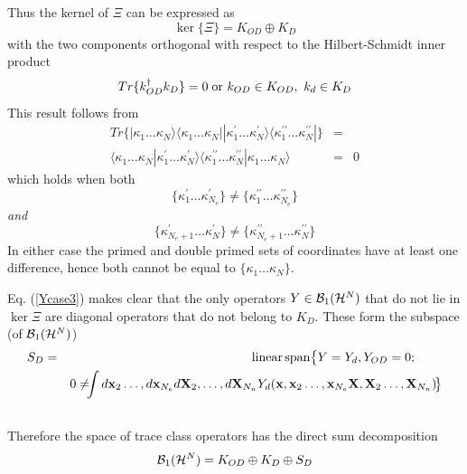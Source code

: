 Thus the kernel of $\Xi $ can be expressed as 
\begin{equation}
\ker \{\Xi \}=K_{OD}\oplus K_{D}
\end{equation}%
with the two components orthogonal with respect to the Hilbert-Schmidt inner
product 
\begin{equation}
Tr\{k_{OD}^{\dagger }k_{D}\}=0\;{\rm or}\,\,k_{OD}\in K_{OD},\,\,k_{d}\in
K_{D}
\end{equation}%
This result follows from 
\begin{eqnarray}
Tr\{|\kappa _{1}\ldots \kappa _{N}\rangle \langle \kappa _{1}\ldots \kappa
_{N}||\kappa _{1}^{\prime }\ldots \kappa _{N}^{\prime }\rangle \langle
\kappa _{1}^{\prime \prime }\ldots \kappa _{N}^{\prime \prime }|\} &=& 
\nonumber \\
\langle \kappa _{1}\ldots \kappa _{N}|\kappa _{1}^{\prime }\ldots \kappa
_{N}^{\prime }\rangle \langle \kappa _{1}^{\prime \prime }\ldots \kappa
_{N}^{\prime \prime }|\kappa _{1}\ldots \kappa _{N}\rangle &=&0
\end{eqnarray}%
which holds when both 
\begin{equation}
\{\kappa _{1}^{\prime }\ldots \kappa _{N_{e}}^{\prime }\}\neq \{\kappa
_{1}^{\prime \prime }\ldots \kappa _{N_{e}}^{\prime \prime }\}
\end{equation}%
{\em and} 
\begin{equation}
\{\kappa _{N_{e}+1}^{\prime }\ldots \kappa _{N}^{\prime }\}\neq \{\kappa
_{N_{e}+1}^{\prime \prime }\ldots \kappa _{N}^{\prime \prime }\}
\end{equation}%
In either case the primed and double primed sets of coordinates have at
least one difference, hence both cannot be equal to $\{\kappa _{1}\ldots
\kappa _{N}\}$.

Eq. (\ref{Ycase3}) makes clear that the only operators $Y\in {\cal B}_{1}(%
{\cal H}^{N})$ that do not lie in $\ker \Xi $ are diagonal operators that do
not belong to $K_{D}$. These form the subspace (of ${\cal B}_{1}({\cal H}%
^{N})$) 
\begin{eqnarray}
S_{D} &=&{\rm linear\,span}\big\{Y=Y_{d},Y_{OD}=0;\big.\qquad  \nonumber \\
&&\big.0\neq \!\!\!\int d{\bf x}_{2}\ldots ,d{\bf x}_{N_{e}}d{\bf X}%
_{2},\ldots ,d{\bf X}_{N_{n}}Y_{d}({\bf x},{\bf x}_{2}\ldots ,{\bf x}_{N_{e}}%
{\bf X},{\bf X}_{2}\ldots ,{\bf X}_{N_{n}})\!\big\}  \nonumber \\
&&  \label{sddefn}
\end{eqnarray}%
Therefore the space of trace class operators has the direct sum
decomposition 
\begin{equation}
{\cal B}_{1}({\cal H}^{N})=K_{OD}\oplus K_{D}\oplus S_{D}  \label{decomp}
\end{equation}

